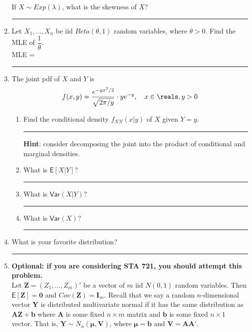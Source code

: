 \documentclass[12pt]{article}
\begin{document}
\begin{enumerate}
If $X \sim Exp(\lambda)$, what is the skewness of $X$?  \rule{6cm}{.01cm} %
\vfill

\item Let $X_1,\ldots, X_n$ be iid $Beta(\theta,1)$ random variables, where $\theta > 0$. Find the MLE of $\dfrac{1}{\theta}$. \\

MLE =  \rule{5cm}{.01cm} %
\vfill
\pagebreak

\item The joint pdf of $X$ and $Y$ is $$f(x,y) = \frac{e^{-yx^2/2}}{\sqrt{2\pi / y}} \cdot ye^{-y}, \quad x \in \reals, y > 0$$
    \begin{enumerate}
        \item Find the conditional density $f_{X|Y}(x|y)$ of $X$ given $Y=y$.  \rule{5cm}{.01cm}  %
        \textbf{Hint}: consider decomposing the joint into the product of conditional and marginal densities.
        
        \vfill
        
        \item What is $\mathsf{E}[X|Y]$?  \rule{6cm}{.01cm} %
        \vfill 
            
        \item What is $\mathsf{Var}(X|Y)$? \rule{6cm}{.01cm}  %
        \vfill 
        
        \item What is $\mathsf{Var}(X)$?  \rule{6cm}{.01cm} %
        \vfill
        \end{enumerate}
\item What is your favorite distribution?  \rule{6cm}{.01cm} 

\pagebreak

\item \textbf{Optional: if you are considering STA 721, you should attempt this problem.} \\
Let $\mathbf{Z} = (Z_1,\ldots, Z_m)'$ be a vector of $m$ iid $N(0,1)$ random variables. Then $\mathsf{E}[\bm{Z}] = \bm{0}$ and $Cov(\bm{Z}) = \bm{I}_m$. Recall that we say a random $n$-dimensional vector $\bm{Y}$ is distributed multivariate normal if it has the same distribution as $\bm{AZ} + \bm{b}$ where $\bm{A}$ is some fixed $ n \times m$ matrix and $\bm{b}$ is some fixed $n \times 1$ vector. That is, $\bm{Y} \sim N_n(\bm{\mu}, \bm{V})$, where $\bm{\mu} = \bm{b}$ and $\bm{V} = \bm{AA'}$. 


\end{enumerate}
\end{document}
